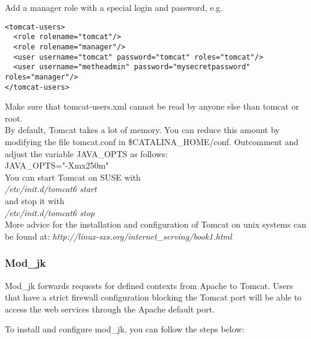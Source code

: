 \documentclass{book}
\begin{document}
Add a manager role with a special login and password, e.g.
\begin{verbatim}
<tomcat-users>
  <role rolename="tomcat"/>
  <role rolename="manager"/>
  <user username="tomcat" password="tomcat" roles="tomcat"/>
  <user username="metheadmin" password="mysecretpassword" roles="manager"/>
</tomcat-users>
\end{verbatim}

Make sure that tomcat-users.xml cannot be read by anyone else than tomcat or root.\\

By default, Tomcat takes a lot of memory. You can reduce this amount by
modifying the file tomcat.conf in \$CATALINA\_HOME/conf.
Outcomment and adjust the variable JAVA\_OPTS as follows:\\
JAVA\_OPTS="-Xmx250m"\\

You can start Tomcat on SUSE with\\
 \textit{/etc/init.d/tomcat6 start}\\
and stop it with\\
 \textit{/etc/init.d/tomcat6 stop}\\

More advice for the installation and configuration of Tomcat on unix systems
can be found at: \textit{http://linux-sxs.org/internet\_serving/book1.html}

\subsubsection{Mod\_jk}
Mod\_jk forwards requests for defined contexts from Apache to Tomcat.
Users that have a strict firewall configuration blocking the Tomcat port
will be able to access the web services through the Apache default port.

To install and configure mod\_jk, you can follow the steps below:
\end{document}
